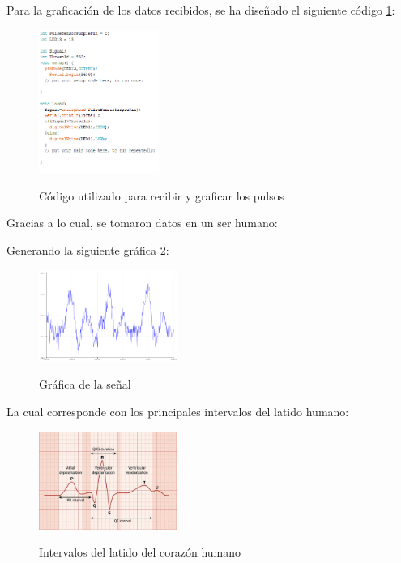 \documentclass[letterpaper, 10 pt, conference]{ieeeconf}  %
\begin{document}
Para la graficaci\'on de los datos recibidos, se ha dise\~nado el siguiente c\'odigo \ref{fig:code}:

\begin{figure}
\centering
\includegraphics[width=0.35\textwidth]{codeArduino.png}
\label{fig:code}
\caption{C\'odigo utilizado para recibir y graficar los pulsos}
\end{figure}

Gracias a lo cual, se tomaron datos en un ser humano:

Generando la siguiente gr\'afica \ref{fig:senal}:
 
\begin{figure}
\centering
\includegraphics[width=0.4\textwidth]{senal.png}
\label{fig:senal}
\caption{Gr\'afica de la se\~nal}
\end{figure}

La cual corresponde con los principales intervalos del latido humano:

\begin{figure}
\centering
\includegraphics[width=0.4\textwidth]{ecg.jpg}
\label{fig:intervalo}
\caption{Intervalos del latido del coraz\'on humano}
\end{figure}
\end{document}
